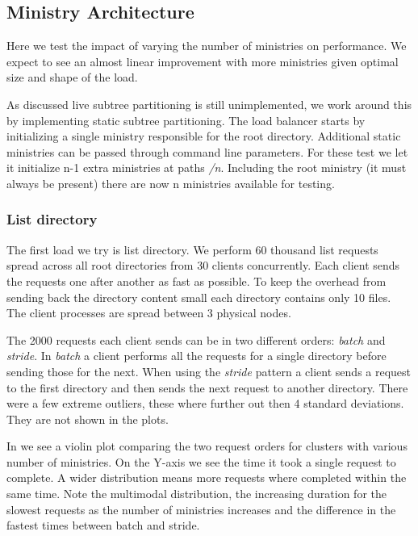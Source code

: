 \subsection{Ministry Architecture} \label{sec:res_arg}
Here we test the impact of varying the number of ministries on performance. We expect to see an almost linear improvement with more ministries given optimal size and shape of the load.

As discussed live subtree partitioning is still unimplemented, we work around this by implementing static subtree partitioning. The load balancer starts by initializing a single ministry responsible for the root directory. Additional static ministries can be passed through command line parameters. For these test we let it initialize n-1 extra ministries at paths \textsl{/n}. Including the root ministry (it must always be present) there are now n ministries available for testing.

\subsubsection{List directory}
The first load we try is list directory. We perform 60 thousand list requests spread across all root directories from 30 clients concurrently. Each client sends the requests one after another as fast as possible. To keep the overhead from sending back the directory content small each directory contains only 10 files. The client processes are spread between 3 physical nodes.

The 2000 requests each client sends can be in two different orders: \textit{batch} and \textit{stride}. In \textit{batch} a client performs all the requests for a single directory before sending those for the next. When using the \textit{stride} pattern a client sends a request to the first directory and then sends the next request to another directory. There were a few extreme outliers, these where further out then 4 standard deviations. They are not shown in the plots.

In  we see a violin plot comparing the two request orders for clusters with various number of ministries. On the Y-axis we see the time it took a single request to complete. A wider distribution means more requests where completed within the same time. Note the multimodal distribution, the increasing duration for the slowest requests as the number of ministries increases and the difference in the fastest times between batch and stride.

